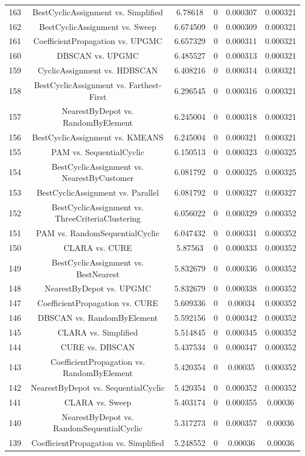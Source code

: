 \documentclass[a4paper,10pt]{article}
\begin{document}
\begin{landscape}
\begin{table}[!htp]
\begin{tabular}{cccccc}
163&BestCyclicAssignment vs. Simplified&6.78618&0&0.000307&0.000321\\
162&BestCyclicAssignment vs. Sweep&6.674509&0&0.000309&0.000321\\
161&CoefficientPropagation vs. UPGMC&6.657329&0&0.000311&0.000321\\
160&DBSCAN vs. UPGMC&6.485527&0&0.000313&0.000321\\
159&CyclicAssignment vs. HDBSCAN&6.408216&0&0.000314&0.000321\\
158&BestCyclicAssignment vs. Farthest-First&6.296545&0&0.000316&0.000321\\
157&NearestByDepot vs. RandomByElement&6.245004&0&0.000318&0.000321\\
156&BestCyclicAssignment vs. KMEANS&6.245004&0&0.000321&0.000321\\
155&PAM vs. SequentialCyclic&6.150513&0&0.000323&0.000325\\
154&BestCyclicAssignment vs. NearestByCustomer&6.081792&0&0.000325&0.000325\\
153&BestCyclicAssignment vs. Parallel&6.081792&0&0.000327&0.000327\\
152&BestCyclicAssignment vs. ThreeCriteriaClustering&6.056022&0&0.000329&0.000352\\
151&PAM vs. RandomSequentialCyclic&6.047432&0&0.000331&0.000352\\
150&CLARA vs. CURE&5.87563&0&0.000333&0.000352\\
149&BestCyclicAssignment vs. BestNearest&5.832679&0&0.000336&0.000352\\
148&NearestByDepot vs. UPGMC&5.832679&0&0.000338&0.000352\\
147&CoefficientPropagation vs. CURE&5.609336&0&0.00034&0.000352\\
146&DBSCAN vs. RandomByElement&5.592156&0&0.000342&0.000352\\
145&CLARA vs. Simplified&5.514845&0&0.000345&0.000352\\
144&CURE vs. DBSCAN&5.437534&0&0.000347&0.000352\\
143&CoefficientPropagation vs. RandomByElement&5.420354&0&0.00035&0.000352\\
142&NearestByDepot vs. SequentialCyclic&5.420354&0&0.000352&0.000352\\
141&CLARA vs. Sweep&5.403174&0&0.000355&0.00036\\
140&NearestByDepot vs. RandomSequentialCyclic&5.317273&0&0.000357&0.00036\\
139&CoefficientPropagation vs. Simplified&5.248552&0&0.00036&0.00036\\

\end{tabular}
\end{table}
\end{landscape}
\end{document}
